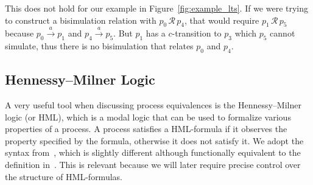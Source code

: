 This does not hold for our example in Figure~\ref{fig:example_lts}.
If we were trying to construct a bisimulation relation with
$p_0\, \mathcal{R}\, p_4$,
that would require $p_1\, \mathcal{R}\, p_5$
because $p_0 \xrightarrow{a} p_1$ and $p_4 \xrightarrow{a} p_5$.
But $p_1$ has a $c$-transition to $p_3$ which $p_5$ cannot simulate,
thus there is no bisimulation that relates $p_0$ and $p_4$.


\subsection{Hennessy--Milner Logic}

A very useful tool when discussing process equivalences is the
Hennessy--Milner logic (or HML),
which is a modal logic that can be used to formalize various
properties of a process.
A process satisfies a HML-formula if it observes
the property specified by the formula,
otherwise it does not satisfy it.
We adopt the syntax from~\cite{bisping2023process},
which is slightly different although functionally equivalent to the definition
in~\cite{reactive_systems}.
This is relevant because we will later require precise control over the
structure of HML-formulas.

